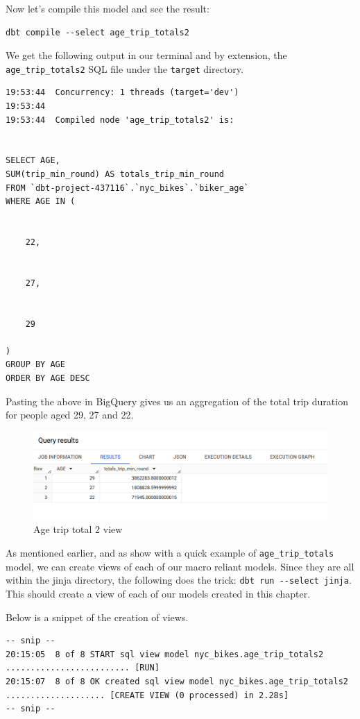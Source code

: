 \documentclass[
]{book}
\begin{document}
Now let's compile this model and see the result:

\begin{verbatim}
dbt compile --select age_trip_totals2
\end{verbatim}

We get the following output in our terminal and by extension, the \texttt{age\_trip\_totals2} SQL file under the \texttt{target} directory.

\begin{verbatim}
19:53:44  Concurrency: 1 threads (target='dev')
19:53:44  
19:53:44  Compiled node 'age_trip_totals2' is:


SELECT AGE, 
SUM(trip_min_round) AS totals_trip_min_round
FROM `dbt-project-437116`.`nyc_bikes`.`biker_age`
WHERE AGE IN (
  
  
    22, 
  
  
    27, 
  
  
    29
  
)
GROUP BY AGE
ORDER BY AGE DESC
\end{verbatim}

Pasting the above in BigQuery gives us an aggregation of the total trip duration for people aged 29, 27 and 22.

\begin{figure}
\centering
\includegraphics{./images/age_trip_totals2.png}
\caption{Age trip total 2 view}
\end{figure}

As mentioned earlier, and as show with a quick example of \texttt{age\_trip\_totals} model, we can create views of each of our macro reliant models. Since they are all within the jinja directory, the following does the trick: \texttt{dbt\ run\ -\/-select\ jinja}. This should create a view of each of our models created in this chapter.

Below is a snippet of the creation of views.

\begin{verbatim}
-- snip --
20:15:05  8 of 8 START sql view model nyc_bikes.age_trip_totals2 ......................... [RUN]
20:15:07  8 of 8 OK created sql view model nyc_bikes.age_trip_totals2 .................... [CREATE VIEW (0 processed) in 2.28s]
-- snip --
\end{verbatim}
\end{document}
